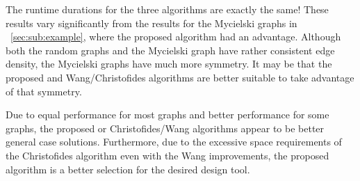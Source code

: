 The runtime durations for the three algorithms are exactly the same!  These results vary significantly from the
results for the Mycielski graphs in \sectionname~\ref{sec:sub:example}, where the proposed algorithm had an
advantage.  Although both the random graphs and the Mycielski graph have rather consistent edge density, the
Mycielski graphs have much more symmetry.  It may be that the proposed and Wang/Christofides algorithms are better
suitable to take advantage of that symmetry.

Due to equal performance for most graphs and better performance for some graphs, the proposed or Christofides/Wang
algorithms appear to be better general case solutions.  Furthermore, due to the excessive space requirements of the
Christofides algorithm even with the Wang improvements, the proposed algorithm is a better selection for the
desired design tool.
